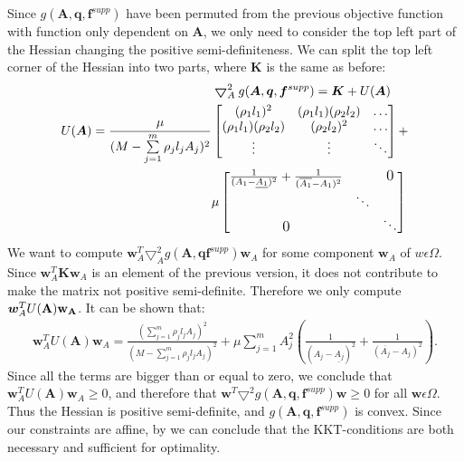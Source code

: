 Since $g(\bm{A},\bm{q},\bm{f}^{supp})$ have been permuted from the previous objective function with function only dependent on $\bm{A}$, we only need to consider the top left part of the Hessian changing the positive semi-definiteness. We can split the top left corner of the Hessian into two parts, where $\bm{K}$ is the same as before:
\begin{align*}
& \bm{\bigtriangledown}_{A}^2 g(\bm{A},\bm{q},\bm{f}^{supp}) = \bm{K} + U(\bm{A}) \\
U(\bm{A}) = \frac{\mu}{(M-\sum\limits_{j=1}^{m}\rho_jl_jA_j)^2} &
\begin{bmatrix}
(\rho_1l_1)^2 & (\rho_1l_1)(\rho_2l_2) & \hdots \\
(\rho_1l_1)(\rho_2l_2) & (\rho_2l_2)^ 2 & \hdots \\
\vdots & \vdots & \ddots \\
\end{bmatrix} + \\
& \mu 
\begin{bmatrix}
\frac{1}{(A_1-\underline{A_{1}})^2} + \frac{1}{(\overline{A_{1}}-A_{1})^2} &  & \text{\large{0}} \\
  & \ddots &  \\
\text{\large0} &  & \ddots \\
\end{bmatrix}
\end{align*}
We want to compute $\bm{w}_{A}^T\bm{\bigtriangledown}_{A}^2g(\bm{A},\bm{q}\bm{f}^{supp})\bm{w}_A$ for some component $\bm{w}_A$ of $w\epsilon\Omega$. Since $\bm{w}_A^T\bm{K}\bm{w}_A$ is an element of the previous version, it does not contribute to make the matrix not positive semi-definite. Therefore we only compute $\bm{w}_A^TU(\bf{A})\bm{w}_A$. It can be shown that:
\begin{align*}
\bm{w}_A^TU(\bm{A})\bm{w}_A = \frac{(\sum\limits_{j=1}^m\rho_jl_jA_j)^2}{(M-\sum\limits_{j=1}^m\rho_jl_jA_j)^2} + \mu\sum\limits_{j=1}^mA_j^2(\frac{1}{(A_j-\underline{A_{j}})^2} + \frac{1}{(\overline{A_{j}}-A_{j})^2}).
\end{align*}
Since all the terms are bigger than or equal to zero, we conclude that \\ $\bm{w}_A^TU(\bm{A})\bm{w}_A \geq 0$, and therefore that $\bm{w}^T\bm{\bigtriangledown}^2 g(\bm{A},\bm{q},\bm{f}^{supp})\bm{w} \geq 0$ for all $\bm{w}\epsilon\Omega$. Thus the Hessian is positive semi-definite, and  $g(\bm{A},\bm{q},\bm{f}^{supp})$ is convex. Since our constraints are affine, by \cite{KKT_suff} we can conclude that the KKT-conditions are both necessary and sufficient for optimality.


